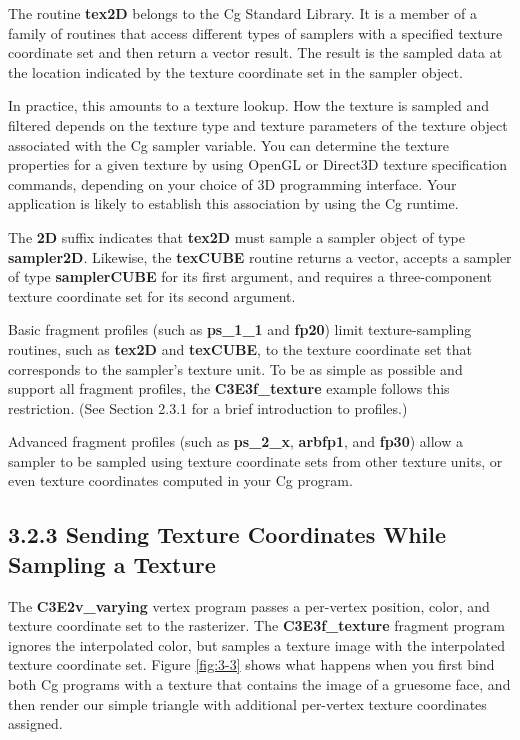 \documentclass[../main.tex]{subfiles}
\begin{document}
The routine \textbf{tex2D} belongs to the Cg Standard Library. It is a member of a family of routines that access different types of samplers with a specified texture coordinate set and then return a vector result. The result is the sampled data at the location indicated by the texture coordinate set in the sampler object.

In practice, this amounts to a texture lookup. How the texture is sampled and filtered depends on the texture type and texture parameters of the texture object associated with the Cg sampler variable. You can determine the texture properties for a given texture by using OpenGL or Direct3D texture specification commands, depending on your choice of 3D programming interface. Your application is likely to establish this association by using the Cg runtime.

The \textbf{2D} suffix indicates that \textbf{tex2D} must sample a sampler object of type \textbf{sampler2D}. Likewise, the \textbf{texCUBE} routine returns a vector, accepts a sampler of type \textbf{samplerCUBE} for its first argument, and requires a three-component texture coordinate set for its second argument.

Basic fragment profiles (such as \textbf{ps_1_1} and \textbf{fp20}) limit texture-sampling routines, such as \textbf{tex2D} and \textbf{texCUBE}, to the texture coordinate set that corresponds to the sampler's texture unit. To be as simple as possible and support all fragment profiles, the \textbf{C3E3f_texture} example follows this restriction. (See Section 2.3.1 for a brief introduction to profiles.)

Advanced fragment profiles (such as \textbf{ps_2_x}, \textbf{arbfp1}, and \textbf{fp30}) allow a sampler to be sampled using texture coordinate sets from other texture units, or even texture coordinates computed in your Cg program.

\subsection{3.2.3 Sending Texture Coordinates While Sampling a Texture}

The \textbf{C3E2v_varying} vertex program passes a per-vertex position, color, and texture coordinate set to the rasterizer. The \textbf{C3E3f_texture} fragment program ignores the interpolated color, but samples a texture image with the interpolated texture coordinate set. Figure \ref{fig:3-3} shows what happens when you first bind both Cg programs with a texture that contains the image of a gruesome face, and then render our simple triangle with additional per-vertex texture coordinates assigned.
\end{document}
